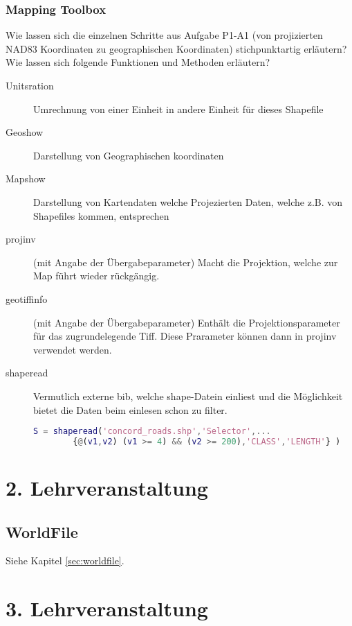 \subsection{Mapping Toolbox}

Wie lassen sich die einzelnen Schritte aus Aufgabe P1-A1 (von projizierten NAD83 Koordinaten zu geographischen Koordinaten) stichpunktartig erläutern?\\
Wie lassen sich folgende Funktionen und Methoden erläutern?

\begin{description}
    \item[Unitsration] Umrechnung von einer Einheit in andere Einheit für dieses Shapefile
    \item[Geoshow] Darstellung von Geographischen koordinaten
    \item[Mapshow] Darstellung von Kartendaten welche Projezierten Daten, welche z.B. von Shapefiles kommen, entsprechen
    \item[projinv] (mit Angabe der Übergabeparameter) Macht die Projektion, welche zur Map führt wieder rückgängig.
    \item[geotiffinfo] (mit Angabe der Übergabeparameter) Enthält die Projektionsparameter für das zugrundelegende Tiff. Diese Prarameter können dann in projinv verwendet werden.
    \item[shaperead] Vermutlich externe bib, welche shape-Datein einliest und die Möglichkeit bietet die Daten beim einlesen schon zu filter.
    \begin{lstlisting}[caption=shaperead.m, language=matlab, label=shaperead]
        S = shaperead('concord_roads.shp','Selector',...
        {@(v1,v2) (v1 >= 4) && (v2 >= 200),'CLASS','LENGTH'} )
    \end{lstlisting}

\end{description}

\chapter{2. Lehrveranstaltung}
\label{ch:2.-lehrveranstaltung}

\section{WorldFile}
Siehe Kapitel \ref{sec:worldfile}.

\chapter{3. Lehrveranstaltung}
\label{ch:3.-lehrveranstaltung}


